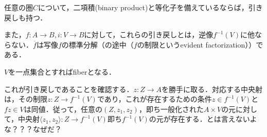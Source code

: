 \documentclass[uplatex, 12pt, dvipdfmx]{jsarticle}
\begin{document}
\begin{corollary}\label{corollary-nesessaries-for-pullback-categories}
    任意の圏$C$について，二項積(binary product)と等化子を備えているならば，引き戻しも持つ．
\end{corollary}

\begin{example}
    また，$f:A\to B, i:V\to B$に対して，これらの引き戻しとは，逆像$f^{-1}(V)$に他ならない．$\overline{f}$は写像$f$の標準分解（の途中（$f$の制限というevident factorization））である．
    \begin{center}
    \end{center}
    $V$を一点集合とすればfiberとなる．

    これが引き戻しであることを確認する．$z:Z\to A$を勝手に取る．対応する中央射は，その制限$z:Z\to f^{-1}(V)$であり，これが存在するための条件$z\in f^{-1}(V)$と$fz\in V$は同値．従って，任意の$(Z,z_1,z_2)$，即ち一般化された$A\times V$の元に対して，中央射$\langle z_1,z_2\rangle :Z\to f^{-1}(V)$即ち$f^{-1}(V)$の元が存在する．とは言えないよな？？？なぜだ？
\end{example}
\end{document}

